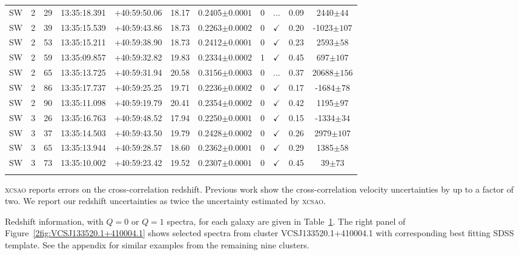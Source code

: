 \begin{landscape}
\begin{longtable}{ccccccccccc}
		SW & 2 & 29 & 13:35:18.391 & +40:59:50.06 & 18.17 & 0.2405$\pm{0.0001}$ & 0 & ... & 0.09 & 2440$\pm{44}$ \\
		SW & 2 & 39 & 13:35:15.539 & +40:59:43.86 & 18.73 & 0.2263$\pm{0.0002}$ & 0 & $\checkmark$ & 0.20 & -1023$\pm{107}$ \\
		SW & 2 & 53 & 13:35:15.211 & +40:59:38.90 & 18.73 & 0.2412$\pm{0.0001}$ & 0 & $\checkmark$ & 0.23 & 2593$\pm{58}$ \\
		SW & 2 & 59 & 13:35:09.857 & +40:59:32.82 & 19.83 & 0.2334$\pm{0.0002}$ & 1 & $\checkmark$ & 0.45 & 697$\pm{107}$ \\
		SW & 2 & 65 & 13:35:13.725 & +40:59:31.94 & 20.58 & 0.3156$\pm{0.0003}$ & 0 & ... & 0.37 & 20688$\pm{156}$ \\
		SW & 2 & 86 & 13:35:17.737 & +40:59:25.25 & 19.71 & 0.2236$\pm{0.0002}$ & 0 & $\checkmark$ & 0.17 & -1684$\pm{78}$ \\
		SW & 2 & 90 & 13:35:11.098 & +40:59:19.79 & 20.41 & 0.2354$\pm{0.0002}$ & 0 & $\checkmark$ & 0.42 & 1195$\pm{97}$ \\
		SW & 3 & 26 & 13:35:16.763 & +40:59:48.52 & 17.94 & 0.2250$\pm{0.0001}$ & 0 & $\checkmark$ & 0.15 & -1334$\pm{34}$ \\
		SW & 3 & 37 & 13:35:14.503 & +40:59:43.50 & 19.79 & 0.2428$\pm{0.0002}$ & 0 & $\checkmark$ & 0.26 & 2979$\pm{107}$ \\
		SW & 3 & 65 & 13:35:13.944 & +40:59:28.57 & 18.60 & 0.2362$\pm{0.0001}$ & 0 & $\checkmark$ & 0.29 & 1385$\pm{58}$ \\
		SW & 3 & 73 & 13:35:10.002 & +40:59:23.42 & 19.52 & 0.2307$\pm{0.0001}$ & 0 & $\checkmark$ & 0.45 & 39$\pm{73}$ \\
	\hline 
	\label{2tbl:VCSJ133520.1+410004.1} 
	\end{longtable}
\end{landscape}

\textsc{xcsao} reports errors on the cross-correlation redshift. Previous work  show the cross-correlation velocity uncertainties by up to a factor of two. We report our redshift uncertainties as twice the uncertainty estimated by \textsc{xcsao}.

Redshift information, with $Q=0$ or $Q=1$ spectra, for each galaxy are given in Table~\ref{2tbl:VCSJ133520.1+410004.1}. The right panel of Figure~\ref{2fig:VCSJ133520.1+410004.1} shows selected spectra from cluster VCSJ133520.1+410004.1 with corresponding best fitting SDSS template. See the appendix for similar examples from the remaining nine clusters.

